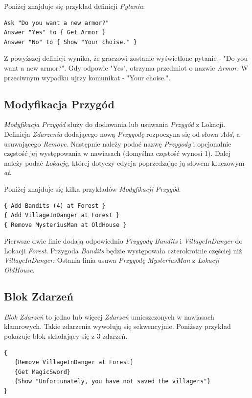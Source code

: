\documentclass[openright]{xmgr}
\begin{document}
Poniżej znajduje się przykład definicji \textit{Pytania}:
\begin{verbatim}
Ask "Do you want a new armor?"
Answer "Yes" to { Get Armor }
Answer "No" to { Show "Your choise." }
\end{verbatim}

Z powyższej definicji wynika, że graczowi zostanie wyświetlone pytanie - "Do you want a new armor?". Gdy odpowie "Yes", otrzyma przedmiot o nazwie \textit{Armor}. W przeciwnym wypadku ujrzy komunikat - "Your choise.".

\subsection{Modyfikacja Przygód}
\textit{Modyfikacja Przygód} służy do dodawania lub usuwania \textit{Przygód} z Lokacji. Definicja \textit{Zdarzenia} dodającego nową \textit{Przygodę} rozpoczyna się od słowa \textit{Add}, a usuwającego \textit{Remove}. Następnie należy podać nazwę \textit{Przygody} i opcjonalnie częstość jej występowania w nawiasach (domyślna częstość wynosi 1). Dalej należy podać \textit{Lokację}, której dotyczy edycja poprzedzając ją słowem kluczowym \textit{at}.

Poniżej znajduje się kilka przykładów \textit{Modyfikacji Przygód}. 
\begin{verbatim}
{ Add Bandits (4) at Forest }
{ Add VillageInDanger at Forest }
{ Remove MysteriusMan at OldHouse }
\end{verbatim}
Pierwsze dwie linie dodają odpowiednio \textit{Przygody} \textit{Bandits} i \textit{VillageInDanger} do Lokacji \textit{Forest}. Przygoda \textit{Bandits} będzie występowała czterokrotnie częściej niż \textit{VillageInDanger}. Ostania linia usuwa \textit{Przygodę} \textit{MysteriusMan} z \textit{Lokacji} \textit{OldHouse}.

\subsection*{Blok Zdarzeń}
\textit{Blok Zdarzeń } to jedno lub więcej \textit{Zdarzeń} umieszczonych w nawiasach klamrowych. Takie zdarzenia wywołują się sekwencyjnie.
Poniższy przykład pokazuje blok składający się z 3 zdarzeń.
\begin{verbatim}
{
   {Remove VillageInDanger at Forest}
   {Get MagicSword}
   {Show "Unfortunately, you have not saved the villagers"}
}
\end{verbatim}
\end{document}
